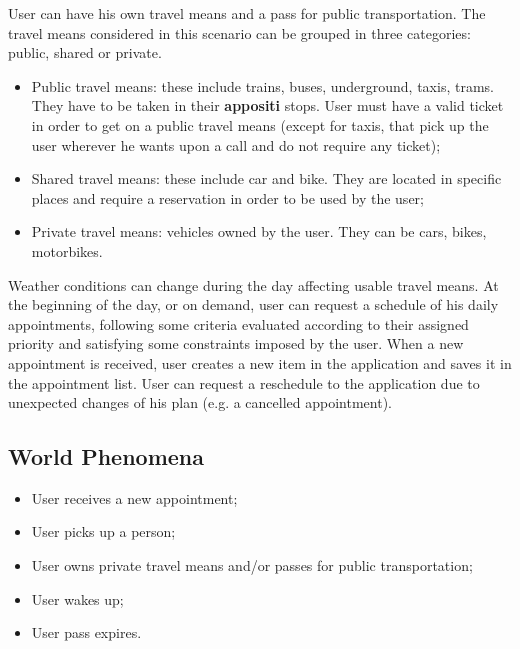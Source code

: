 User can have his own travel means and a pass for public transportation. 
The travel means considered in this scenario can be grouped in three categories: public, shared or private.
\begin{itemize}
\item Public travel means: these include trains, buses, underground, taxis, trams. They have to be taken in their \textbf{appositi} stops. User must have a valid ticket in order to get on a public travel means (except for taxis, that pick up the user wherever he wants upon a call and do not require any ticket); 
\item Shared travel means: these include car and bike. They are located in specific places and require a reservation in order to be used by the user;
\item Private travel means: vehicles owned by the user. They can be cars, bikes, motorbikes.
\end{itemize}

Weather conditions can change during the day affecting usable travel means.
At the beginning of the day, or on demand, user can request a schedule of his daily appointments, following some criteria evaluated according to their assigned priority and satisfying some constraints imposed by the user.
When a new appointment is received, user creates a new item in the application and saves it in the appointment list. User can request a reschedule to the application due to unexpected changes of his plan (e.g. a cancelled appointment).

\subsection{World Phenomena}
\begin{itemize}
\item User receives a new appointment;
\item User picks up a person;
\item User owns private travel means and/or passes for public transportation;
\item User wakes up;
\item User pass expires.
\end{itemize}

